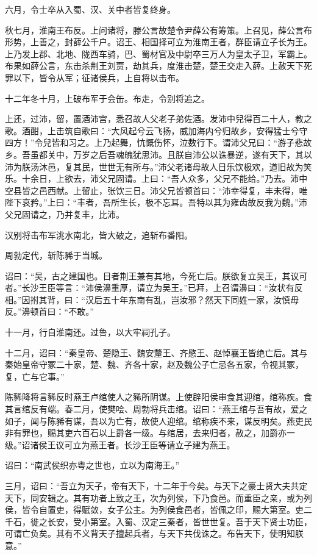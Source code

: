 \documentclass[]{article}
\begin{document}
六月，令士卒从入蜀、汉、关中者皆复终身。

秋七月，淮南王布反。上问诸将，滕公言故楚令尹薛公有筹策。上召见，薛公言布形势，上善之，封薛公千户。诏王、相国择可立为淮南王者，群臣请立子长为王。上乃发上郡、北地、陇西车骑，巴、蜀材官及中尉卒三万人为皇太子卫，军霸上。布果如薛公言，东击杀荆王刘贾，劫其兵，度淮击楚，楚王交走入薛。上赦天下死罪以下，皆令从军；征诸侯兵，上自将以击布。

十二年冬十月，上破布军于会缶。布走，令别将追之。

上还，过沛，留，置酒沛宫，悉召故人父老子弟佐酒。发沛中兒得百二十人，教之歌。酒酣，上击筑自歌曰：``大风起兮云飞扬，威加海内兮归故乡，安得猛士兮守四方！''令兒皆和习之。上乃起舞，忼慨伤怀，泣数行下。谓沛父兄曰：``游子悲故乡。吾虽都关中，万岁之后吾魂魄犹思沛。且朕自沛公以诛暴逆，遂有天下，其以沛为朕汤沐邑，复其民，世世无有所与。''沛父老诸母故人日乐饮极欢，道旧故为笑乐。十余日，上欲去，沛父兄固请。上曰：``吾人众多，父兄不能给。''乃去。沛中空县皆之邑西献。上留止，张饮三日。沛父兄皆顿首曰：``沛幸得复，丰未得，唯陛下哀矜。''上曰：``丰者，吾所生长，极不忘耳。吾特以其为雍齿故反我为魏。''沛父兄固请之，乃并复丰，比沛。

汉别将击布军洮水南北，皆大破之，追斩布番阳。

周勃定代，斩陈豨于当城。

诏曰：``吴，古之建国也。日者荆王兼有其地，今死亡后。朕欲复立吴王，其议可者。''长沙王臣等言：``沛侯濞重厚，请立为吴王。''已拜，上召谓濞曰：``汝状有反相。''因拊其背，曰：``汉后五十年东南有乱，岂汝邪？然天下同姓一家，汝慎毋反。''濞顿首曰：``不敢。''

十一月，行自淮南还。过鲁，以大牢祠孔子。

十二月，诏曰：``秦皇帝、楚隐王、魏安釐王、齐愍王、赵悼襄王皆绝亡后。其与秦始皇帝守冢二十家，楚、魏、齐各十家，赵及魏公子亡忌各五家，令视其冢，复，亡与它事。''

陈豨降将言豨反时燕王卢绾使人之豨所阴谋。上使辟阳侯审食其迎绾，绾称疾。食其言绾反有端。春二月，使樊哙、周勃将兵击绾。诏曰：``燕王绾与吾有故，爱之如子，闻与陈豨有谋，吾以为亡有，故使人迎绾。绾称疾不来，谋反明矣。燕吏民非有罪也，赐其吏六百石以上爵各一级。与绾居，去来归者，赦之，加爵亦一级。''诏诸侯王议可立为燕王者。长沙王臣等请立子建为燕王。

诏曰：``南武侯织亦粤之世也，立以为南海王。''

三月，诏曰：``吾立为天子，帝有天下，十二年于今矣。与天下之豪士贤大夫共定天下，同安辑之。其有功者上致之王，次为列侯，下乃食邑。而重臣之亲，或为列侯，皆令自置吏，得赋敛，女子公主。为列侯食邑者，皆佩之印，赐大第室。吏二千石，徙之长安，受小第室。入蜀、汉定三秦者，皆世世复。吾于天下贤士功臣，可谓亡负矣。其有不义背天子擅起兵者，与天下共伐诛之。布告天下，使明知朕意。''
\end{document}
